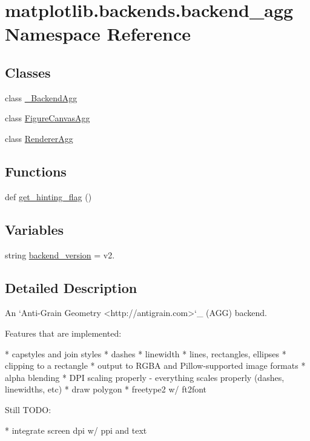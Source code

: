 \hypertarget{namespacematplotlib_1_1backends_1_1backend__agg}{}\section{matplotlib.\+backends.\+backend\+\_\+agg Namespace Reference}
\label{namespacematplotlib_1_1backends_1_1backend__agg}
\subsection*{Classes}
\begin{DoxyCompactItemize}
\item 
class \hyperlink{classmatplotlib_1_1backends_1_1backend__agg_1_1__BackendAgg}{\+\_\+\+Backend\+Agg}
\item 
class \hyperlink{classmatplotlib_1_1backends_1_1backend__agg_1_1FigureCanvasAgg}{Figure\+Canvas\+Agg}
\item 
class \hyperlink{classmatplotlib_1_1backends_1_1backend__agg_1_1RendererAgg}{Renderer\+Agg}
\end{DoxyCompactItemize}
\subsection*{Functions}
\begin{DoxyCompactItemize}
\item 
def \hyperlink{namespacematplotlib_1_1backends_1_1backend__agg_adccb4fce32c74db4ca56b30029df4356}{get\+\_\+hinting\+\_\+flag} ()
\end{DoxyCompactItemize}
\subsection*{Variables}
\begin{DoxyCompactItemize}
\item 
string \hyperlink{namespacematplotlib_1_1backends_1_1backend__agg_a7d6b753bea3fa5b7ac3467cc123d2156}{backend\+\_\+version} = \textquotesingle{}v2.\textquotesingle{}
\end{DoxyCompactItemize}


\subsection{Detailed Description}
\begin{DoxyVerb}An `Anti-Grain Geometry <http://antigrain.com>`_ (AGG) backend.

Features that are implemented:

* capstyles and join styles
* dashes
* linewidth
* lines, rectangles, ellipses
* clipping to a rectangle
* output to RGBA and Pillow-supported image formats
* alpha blending
* DPI scaling properly - everything scales properly (dashes, linewidths, etc)
* draw polygon
* freetype2 w/ ft2font

Still TODO:

* integrate screen dpi w/ ppi and text
\end{DoxyVerb}
 

